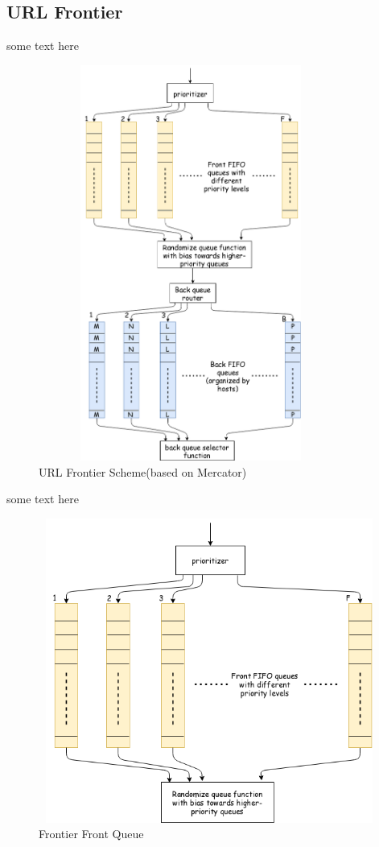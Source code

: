 \pagebreak

\subsection{URL Frontier}
some text here
\begin{figure}[h!]
  \centering
  \includegraphics[width=10cm,height=13cm,keepaspectratio]{../media/crawler/url-frontier.png}
  \caption{URL Frontier Scheme(based on Mercator)}
  \label{fig:frontier}
\end{figure}

\pagebreak
some text here
\begin{figure}[h!]
  \centering
  \includegraphics[width=13cm,height=10cm,keepaspectratio]{../media/crawler/f-queue.png}
  \caption{Frontier Front Queue}
  \label{fig:fqueue}
\end{figure}

